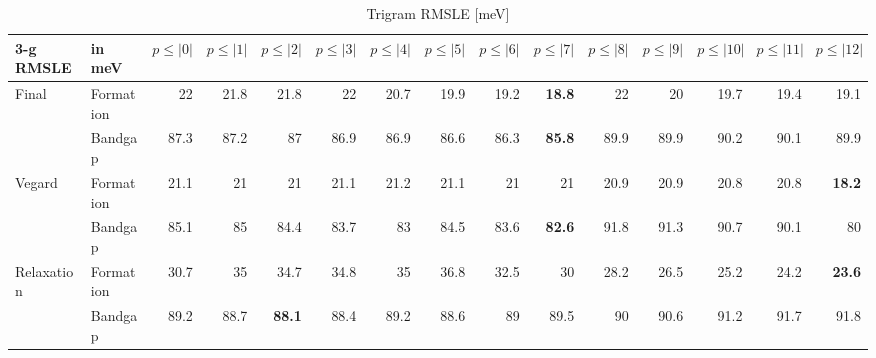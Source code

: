 \documentclass[11pt,oneside,czech,american]{book} %
\theoremstyle{definition} %
\theoremstyle{definition}
\begin{document}
\begin{table}[H]
	\scriptsize
	\centering
\begin{tabular}{llrrrrrrrrrrrrr}
	\hline
	3-g RMSLE   & in meV    &   $p{\leq}|0|$ &   $p{\leq}|1|$ &   $p{\leq}|2|$ &   $p{\leq}|3|$ &   $p{\leq}|4|$ &   $p{\leq}|5|$ &   $p{\leq}|6|$ &   $p{\leq}|7|$ &   $p{\leq}|8|$ &   $p{\leq}|9|$ &   $p{\leq}|10|$ &   $p{\leq}|11|$ &   $p{\leq}|12|$ \\
	\hline
	\multirow{2}{*}{Final}       & Formation &       22   &       21.8 &       21.8 &       22   &       20.7 &       19.9 &       19.2 &       \textbf{18.8} &       22   &       20   &        19.7 &        19.4 &        19.1 \\
	       & Bandgap   &       87.3 &       87.2 &       87   &       86.9 &       86.9 &       86.6 &       86.3 &       \textbf{85.8} &       89.9 &       89.9 &        90.2 &        90.1 &        89.9 \\
	\multirow{2}{*}{Vegard}      & Formation &       21.1 &       21   &       21   &       21.1 &       21.2 &       21.1 &       21   &       21   &       20.9 &       20.9 &        20.8 &        20.8 &        \textbf{18.2} \\
	      & Bandgap   &       85.1 &       85   &       84.4 &       83.7 &       83   &       84.5 &       83.6 &       \textbf{82.6} &       91.8 &       91.3 &        90.7 &        90.1 &        80   \\
	\multirow{2}{*}{Relaxation}  & Formation &       30.7 &       35   &       34.7 &       34.8 &       35   &       36.8 &       32.5 &       30   &       28.2 &       26.5 &        25.2 &        24.2 &        \textbf{23.6} \\
	  & Bandgap   &       89.2 &       88.7 &       \textbf{88.1} &       88.4 &       89.2 &       88.6 &       89   &       89.5 &       90   &       90.6 &        91.2 &        91.7 &        91.8 \\
	\hline
\end{tabular}
	\caption{Trigram RMSLE [meV]}
	\label{3-g RMSLE hat}
\end{table}
\end{document}

